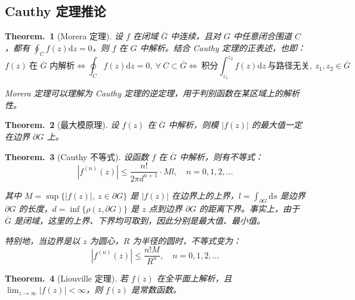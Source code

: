 \documentclass[UTF8]{report}
\theoremstyle{MyLineTheoremStyle} %
\newtheorem{LineTheorem}{Theorem.\,}
\theoremstyle{MyBlockTheoremStyle} %
\newtheorem{BlockTheorem}[LineTheorem]{Theorem.\,} %
\theoremstyle{MySubsubsectionStyle} %
\begin{document}
\subsection{Cauthy 定理推论}

\begin{BlockTheorem}[Morera 定理]\label{Morera 定理}
设 $f$ 在闭域 $\overline{G} $ 中连续，且对 $G$ 中任意闭合围道 $C$，都有 $\oint_{C} f(z) \mathrm{d}z = 0$，则 $f$ 在 $G$ 中解析。结合 Cauthy 定理的正表述，也即：
\begin{equation}
f(z) \ \text{在 $\overline{G} $ 内解析} \Longleftrightarrow  \oint_{C} f(z) \mathrm{d}z = 0,\ \forall\ C \subset \overline{G}  \Longleftrightarrow  \ \text{积分} \int_{z_1}^{z_2} f(z) \mathrm{d}z \ \text{与路径无关},\ z_1, z_2 \in \overline{G} 
\end{equation}

Morera 定理可以理解为 Cauthy 定理的逆定理，用于判别函数在某区域上的解析性。
\end{BlockTheorem}

\begin{LineTheorem}[最大模原理]\label{最大模原理}
    设 $f(z)$ 在 $\overline{G}$ 中解析，则模 $| f(z) |$ 的最大值一定在边界 $\partial G$ 上。
\end{LineTheorem}


\begin{BlockTheorem}[Cauthy 不等式]\label{Cauthy 不等式}
设函数 $f$ 在 $\overline{G}$ 中解析，则有不等式：
\begin{equation}
\left| f^{(n)}(z) \right| \leqslant \frac{n!}{2 \pi d^{n+1}}\cdot Ml ,\quad n = 0, 1, 2, ...
\end{equation}

其中 $M = \sup \{ | f(z) |,\ z \in \partial G \}$ 是 $| f(z) |$ 在边界上的上界，$l = \int_{\partial G} \mathrm{d}s$ 是边界 $\partial G$ 的长度，$d = \inf \{ \rho(z, \partial G) \}$ 是 $z$ 点到边界 $\partial G$ 的距离下界。事实上，由于 $\overline{G}$ 是闭域，这里的上界、下界均可取到，因此分别是最大值、最小值。

特别地，当边界是以 $z$ 为圆心，$R$ 为半径的圆时，不等式变为：
\begin{equation}
\left| f^{(n)}(z) \right| \leqslant \frac{n! M}{ R^{n}} ,\quad n = 0, 1, 2, ...
\end{equation}
\end{BlockTheorem}

\begin{LineTheorem}[Liouville 定理]\label{Liouville 定理}
若 $f(z)$ 在全平面上解析，且 $\displaystyle \lim_{z \to \infty} | f(z) | < \infty$，则 $f(z)$ 是常数函数。
\end{LineTheorem}
\end{document}
